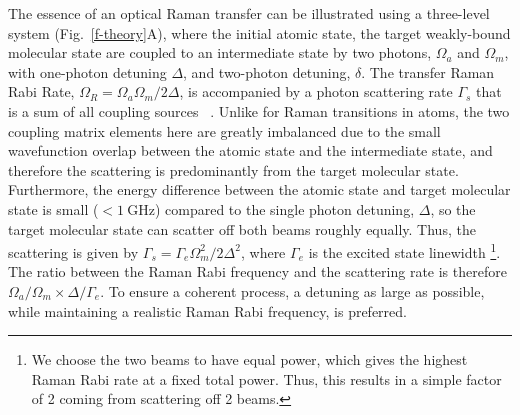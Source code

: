 \documentclass[aps,prl,twocolumn,superscriptaddress]{revtex4-1}
\begin{document}
The essence of an optical Raman transfer can be illustrated using a three-level system (Fig.~\ref{f-theory}A), where the initial atomic state, the target weakly-bound molecular state are coupled to an intermediate state by two photons, $\Omega_a$ and $\Omega_m$, with one-photon detuning $ \Delta $, and two-photon detuning, $ \delta$.  %
The transfer Raman Rabi Rate, $\Omega_R=\Omega_a\Omega_m / 2\Delta$, is accompanied by a photon scattering rate $\Gamma_s$ that is a sum of all coupling sources%
~\cite{Wineland2003}.
Unlike for Raman transitions in atoms, the two coupling matrix elements here are greatly imbalanced %
due to the small wavefunction overlap between the atomic state and the intermediate state, %
and therefore the scattering is predominantly from the target molecular state. Furthermore, the energy difference between the atomic state and target molecular state is small ($ < 1~\mathrm{GHz} $) compared to the single photon detuning, $ \Delta $, so the target molecular state can scatter off both beams roughly equally. Thus, the scattering is given by $ \Gamma_s=\Gamma_e \Omega_m^2 / 2\Delta^2$, where $ \Gamma_e $ is the excited state linewidth \footnote{We choose the two beams to have equal power, which gives the highest Raman Rabi rate at a fixed total power. Thus, this results in a simple factor of 2 coming from scattering off 2 beams.}.
The ratio between the Raman Rabi frequency and the scattering rate is therefore $ \Omega_a/\Omega_m \times \Delta/\Gamma_e $. %
To ensure a coherent process, a detuning as large as possible, while maintaining a realistic Raman Rabi frequency, is preferred. %
\end{document}
